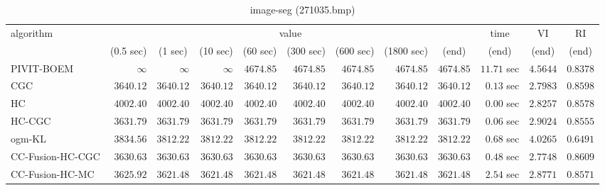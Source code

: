 \begin{table}[H]
\scriptsize
\centering
\caption{image-seg (271035.bmp)}
\label{tab:anytimetable-image-seg-271035.bmp}
\begin{tabular}{lrrrrrrrrrrr}
\toprule
           algorithm &                                   \multicolumn{8}{c}{value} & \multicolumn{1}{c}{time}    & \multicolumn{1}{c}{VI}  & \multicolumn{1}{c}{RI} \\  
\cmidrule(lr){2-9}\cmidrule(lr){10-10} \cmidrule(lr){11-11} \cmidrule(lr){12-12}   
                     & \multicolumn{1}{c}{(0.5 sec)} & \multicolumn{1}{c}{(1 sec)} & \multicolumn{1}{c}{(10 sec)} & \multicolumn{1}{c}{(60 sec)} & \multicolumn{1}{c}{(300 sec)} & \multicolumn{1}{c}{(600 sec)} & \multicolumn{1}{c}{(1800 sec)} & \multicolumn{1}{c}{(end)} & \multicolumn{1}{c}{(end)}    & \multicolumn{1}{c}{(end)}   & \multicolumn{1}{c}{(end)}  \\ \midrule 
          PIVIT-BOEM & $\infty$ & $\infty$ & $\infty$ & $      4674.85$ & $      4674.85$ & $      4674.85$ & $      4674.85$ & $      4674.85$ & $        11.71$ sec    & $       4.5644$  & $       0.8378$ \\ 
                 CGC & $      3640.12$ & $      3640.12$ & $      3640.12$ & $      3640.12$ & $      3640.12$ & $      3640.12$ & $      3640.12$ & $      3640.12$ & $         0.13$ sec    & $       2.7983$  & $       0.8598$ \\ 
                  HC & $      4002.40$ & $      4002.40$ & $      4002.40$ & $      4002.40$ & $      4002.40$ & $      4002.40$ & $      4002.40$ & $      4002.40$ & $         0.00$ sec    & $       2.8257$  & $       0.8578$ \\ 
              HC-CGC & $      3631.79$ & $      3631.79$ & $      3631.79$ & $      3631.79$ & $      3631.79$ & $      3631.79$ & $      3631.79$ & $      3631.79$ & $         0.06$ sec    & $       2.9024$  & $       0.8555$ \\ 
              ogm-KL & $      3834.56$ & $      3812.22$ & $      3812.22$ & $      3812.22$ & $      3812.22$ & $      3812.22$ & $      3812.22$ & $      3812.22$ & $         0.68$ sec    & $       4.0265$  & $       0.6491$ \\ 
    CC-Fusion-HC-CGC & $      3630.63$ & $      3630.63$ & $      3630.63$ & $      3630.63$ & $      3630.63$ & $      3630.63$ & $      3630.63$ & $      3630.63$ & $         0.48$ sec    & $       2.7748$  & $       0.8609$ \\ 
     CC-Fusion-HC-MC & $      3625.92$ & $      3621.48$ & $      3621.48$ & $      3621.48$ & $      3621.48$ & $      3621.48$ & $      3621.48$ & $      3621.48$ & $         2.54$ sec    & $       2.8771$  & $       0.8571$ \\ 

\end{tabular}
\end{table}
